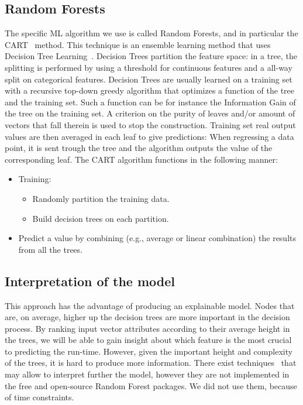 \documentclass{article}
\begin{document}
\subsection{Random Forests}
\label{sub:random_forests}
The specific ML algorithm we use is called Random Forests, and in particular the CART~\cite{randomforest} method.
This technique is an ensemble learning method that uses Decision Tree Learning~\cite{decisiontrees}.
Decision Trees partition the feature space: in a tree, the splitting is performed by using a threshold for continuous features and a all-way split on categorical features.
Decision Trees are usually learned on a training set with a recursive top-down greedy algorithm that optimizes a function of the tree and the training set.
Such a function can be for instance the Information Gain of the tree on the training set. A criterion on the purity of leaves and/or amount of vectors that fall therein is used to stop the construction. Training set real output values are then averaged in each leaf to give predictions: When regressing a data point, it is sent trough the tree and the algorithm outputs the value of the corresponding leaf.
The CART algorithm functions in the following manner:
\begin{itemize}
  \item Training: \begin{itemize}
      \item Randomly partition the training data.
      \item Build decision trees on each partition.
    \end{itemize}
  \item Predict a value by combining (e.g., average or linear combination) the results from all the trees.
\end{itemize}

\subsection{Interpretation of the model}
\label{sub:explainability}
This approach has the advantage of producing an explainable model.
Nodes that are, on average, higher up the decision trees are more important in the decision process.
By ranking input vector attributes according to their average height in the trees, we will be able to gain insight about which feature is the most crucial to predicting the run-time.
However, given the important height and complexity of the trees, it is hard to produce more information.
There exist techniques~\cite{interpret} that may allow to interpret further the model, however they are not implemented in the free and open-source Random Forest packages. We did not use them, because of time constraints.
\end{document}
